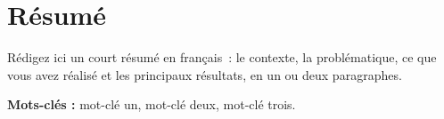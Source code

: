 \chapter*{Résumé}
\thispagestyle{plain}

Rédigez ici un court résumé en français~: le contexte, la problématique,
ce que vous avez réalisé et les principaux résultats, en un ou deux
paragraphes.

\vspace{1em}
\noindent\textbf{Mots-clés :} mot-clé un, mot-clé deux, mot-clé trois.

\newpage
